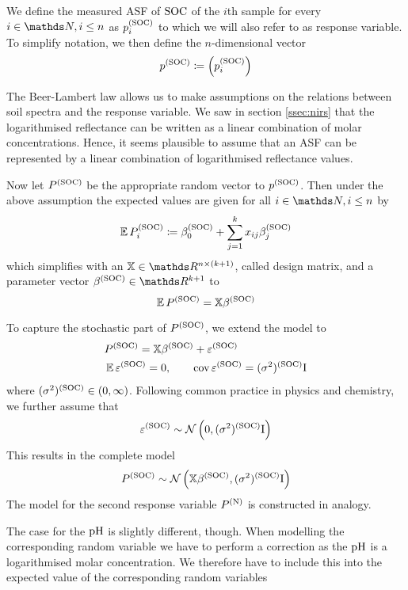 	
		We define the measured ASF of $\mathrm{SOC}$ of the $i$th sample for every $i\in\SN,i\leq n$ as $p^{\mathrm{(SOC)}}_i$ to which we will also refer to as response variable.
		To simplify notation, we then define the $n$-dimensional vector
		\[
			p^{\mathrm{(SOC)}} \coloneqq \left( p^{\mathrm{(SOC)}}_i \right)
		\]

		The Beer-Lambert law allows us to make assumptions on the relations between soil spectra and the response variable.
		We saw in section \ref{ssec:nirs} that the logarithmised reflectance can be written as a linear combination of molar concentrations.
		Hence, it seems plausible to assume that an ASF can be represented by a linear combination of logarithmised reflectance values.

		Now let $P^{\mathrm{(SOC)}}$ be the appropriate random vector to $p^{\mathrm{(SOC)}}$.
		Then under the above assumption the expected values are given for all $i \in \SN, i \leq n$ by
		\[
			\operatorname{\mathbb{E}} P_i^{\mathrm{(SOC)}} \coloneqq \beta^{\mathrm{(SOC)}}_0 + \sum_{j = 1}^k{x_{ij}\beta^{\mathrm{(SOC)}}_j} 
		\]
		which simplifies with an $\mathbb{X} \in \SR^{n \times (k+1)}$, called design matrix, and a parameter vector $\beta^\m{(SOC)} \in \SR^{k+1}$ to
		\[
			\operatorname{\mathbb{E}} P^{\mathrm{(SOC)}} = \mathbb{X}\beta^{\mathrm{(SOC)}}
		\]
		
		To capture the stochastic part of $P^{\mathrm{(SOC)}}$, we extend the model to
		\begin{alignat*}{3}
			&P^{\mathrm{(SOC)}} = \mathbb{X}\beta^{\mathrm{(SOC)}} + \varepsilon^{\mathrm{(SOC)}} \\
			&\operatorname{\mathbb{E}} \varepsilon^{\mathrm{(SOC)}} = 0, \qquad \operatorname{cov} \varepsilon^{\mathrm{(SOC)}} = (\sigma^2)^{\mathrm{(SOC)}} \mathrm{I}
		\end{alignat*}
		where $(\sigma^2)^{\mathrm{(SOC)}} \in (0,\infty)$. Following common practice in physics and chemistry, we further assume that 
		\[
			\varepsilon^{\mathrm{(SOC)}} \sim \mathcal{N} \left( 0,(\sigma^2)^{\mathrm{(SOC)}}\mathrm{I} \right)
		\]
		This results in the complete model
		\[
			P^{\mathrm{(SOC)}} \sim \mathcal{N} \left( \mathbb{X}\beta^{\mathrm{(SOC)}},(\sigma^2)^{\mathrm{(SOC)}} \mathrm{I} \right)
		\]
		The model for the second response variable $P^{\mathrm{(N)}}$ is constructed in analogy.
		
		The case for the $\mathrm{pH}$ is slightly different, though. 
		When modelling the corresponding random variable we have to perform a correction as the $\mathrm{pH}$ is a logarithmised molar concentration.
		We therefore have to include this into the expected value of the corresponding random variables
		

